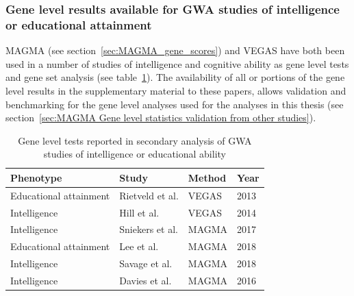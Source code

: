 
\subsubsection{Gene level results available for GWA studies of intelligence or educational attainment}
\label{sec:tmp bit about gene level tests in studies of intelligence}

MAGMA \cite{de2015magma} (see section~\ref{sec:MAGMA_gene_scores}) and VEGAS have both been used in a  number of studies of intelligence and cognitive ability as gene level tests and gene set analysis (see table~\ref{tab:Gene tests in intelligence and educational attainment studies}). The availability of all or portions of the gene level results in the supplementary material to these papers, allows validation and benchmarking for the gene level analyses used for the analyses in this thesis (see section~\ref{sec:MAGMA Gene level statistics validation from other studies}).

\begin{table}[]
    \centering
    \setlength{\extrarowheight}{2pt}
    \begin{tabular}{llll}
        \toprule
      Phenotype & Study  & Method & Year  \\
        \midrule
       Educational attainment  & Rietveld et al.\cite{rietveld2013gwas}  & VEGAS &  2013\\
      Intelligence  &Hill et al.\cite{hill2014human} & VEGAS & 2014\\
      Intelligence & Sniekers et al.\cite{sniekers2017genome} & MAGMA & 2017\\
      Educational attainment & Lee et al.\cite{lee2018gene} & MAGMA & 2018 \\
      Intelligence & Savage et al.\cite{savage2018genome}& MAGMA & 2018 \\
      Intelligence & Davies et al. \cite{davies2016genome} & MAGMA & 2016 \\
    \bottomrule
    \end{tabular}
    \caption{Gene level tests reported in secondary analysis of GWA studies of intelligence or educational ability}
    \label{tab:Gene tests in intelligence and educational attainment studies}
\end{table}











